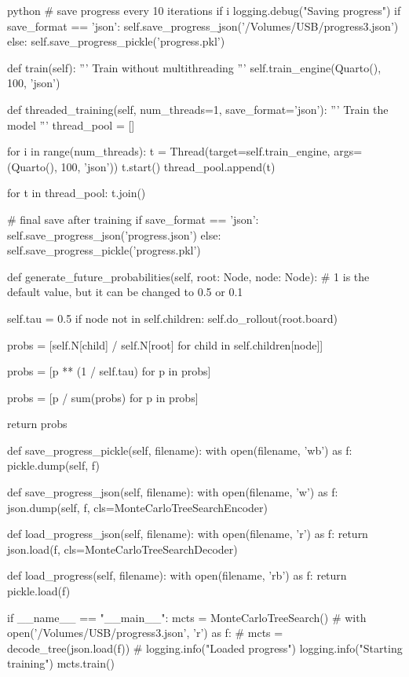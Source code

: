 \begin{mintedbox}{python}
            # save progress every 10 iterations
            if i %
                logging.debug("Saving progress")
                if save_format == 'json':
                    self.save_progress_json('/Volumes/USB/progress3.json')
                else:
                    self.save_progress_pickle('progress.pkl')

    def train(self):
        '''
        Train without multithreading
        '''
        self.train_engine(Quarto(), 100, 'json')

    def threaded_training(self, num_threads=1, save_format='json'):
        '''
        Train the model
        '''
        thread_pool = []

        for i in range(num_threads):
            t = Thread(target=self.train_engine, args=(Quarto(), 100, 'json'))
            t.start()
            thread_pool.append(t)

        for t in thread_pool:
            t.join()

        # final save after training
        if save_format == 'json':
            self.save_progress_json('progress.json')
        else:
            self.save_progress_pickle('progress.pkl')

    def generate_future_probabilities(self, root: Node, node: Node):
        # 1 is the default value, but it can be changed to 0.5 or 0.1

        self.tau = 0.5
        if node not in self.children:
            self.do_rollout(root.board)

        probs = [self.N[child] / self.N[root]
                    for child in self.children[node]]

        probs = [p ** (1 / self.tau) for p in probs]

        probs = [p / sum(probs) for p in probs]

        return probs

    def save_progress_pickle(self, filename):
        with open(filename, 'wb') as f:
            pickle.dump(self, f)

    def save_progress_json(self, filename):
        with open(filename, 'w') as f:
            json.dump(self, f, cls=MonteCarloTreeSearchEncoder)

    def load_progress_json(self, filename):
        with open(filename, 'r') as f:
            return json.load(f, cls=MonteCarloTreeSearchDecoder)

    def load_progress(self, filename):
        with open(filename, 'rb') as f:
            return pickle.load(f)


if __name__ == "__main__":
    mcts = MonteCarloTreeSearch()
    # with open('/Volumes/USB/progress3.json', 'r') as f:
    #     mcts = decode_tree(json.load(f))
    #     logging.info("Loaded progress")
    logging.info("Starting training")
    mcts.train()

\end{mintedbox}

